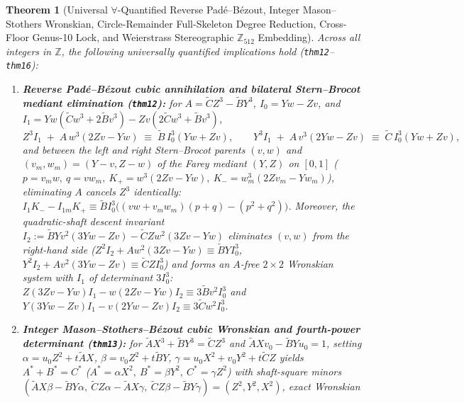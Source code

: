 \documentclass[11pt,a4paper]{article}
\theoremstyle{plain}
\newtheorem{theorem}{Theorem}[section]
\theoremstyle{definition}
\begin{document}
\begin{theorem}[Universal $\forall$-Quantified Reverse Pad\'e--B\'ezout, Integer Mason--Stothers Wronskian, Circle-Remainder Full-Skeleton Degree Reduction, Cross-Floor Genus-10 Lock, and Weierstrass Stereographic $\mathbb{Z}_{512}$ Embedding]
\label{thm:main-12-16}
Across all integers in $\mathbb{Z}$, the following universally quantified implications hold (\texttt{thm12}--\texttt{thm16}):
\begin{enumerate}[label=\textbf{(\roman*)},leftmargin=*]
\item \textbf{Reverse Pad\'e--B\'ezout cubic annihilation and bilateral Stern--Brocot mediant elimination (\texttt{thm12}):}
  for $A = \widetilde{C}Z^3 - \widetilde{B}Y^3$, $I_0 = Yw - Zv$, and $I_1 = Yw(\widetilde{C}w^3+2\widetilde{B}v^3) - Zv(2\widetilde{C}w^3+\widetilde{B}v^3)$,
  \begin{equation}
    \label{eq:reverse-pade-bezout}
    Z^3 I_1 \;+\; A\,w^3(2Zv - Yw) \;\equiv\; \widetilde{B}\,I_0^3(Yw + Zv),\qquad
    Y^3 I_1 \;+\; A\,v^3(2Yw - Zv) \;\equiv\; \widetilde{C}\,I_0^3(Yw + Zv),
  \end{equation}
  and between the left and right Stern--Brocot parents $(v,w)$ and $(v_m,w_m) = (Y-v,Z-w)$ of the Farey mediant $(Y,Z)$ on $[0,1]$ ($p = v_m w,\ q = v w_m,\ K_+ = w^3(2Zv-Yw),\ K_- = w_m^3(2Zv_m-Yw_m)$), eliminating $A$ cancels $Z^3$ identically: $I_1 K_- - I_{1m} K_+ \equiv \widetilde{B} I_0^3\bigl((vw + v_m w_m)(p+q) - (p^2+q^2)\bigr)$. Moreover, the quadratic-shaft descent invariant $I_2 := \widetilde{B}Yv^2(3Yw-Zv) - \widetilde{C}Zw^2(3Zv-Yw)$ eliminates $(v,w)$ from the right-hand side ($Z^2 I_2 + A w^2(3Zv-Yw) \equiv \widetilde{B}Y I_0^3$, $Y^2 I_2 + A v^2(3Yw-Zv) \equiv \widetilde{C}Z I_0^3$) and forms an $A$-free $2\times 2$ Wronskian system with $I_1$ of determinant $3 I_0^3$: $Z(3Zv-Yw)I_1 - w(2Zv-Yw)I_2 \equiv 3\widetilde{B}v^2 I_0^3$ and $Y(3Yw-Zv)I_1 - v(2Yw-Zv)I_2 \equiv 3\widetilde{C}w^2 I_0^3$.
\item \textbf{Integer Mason--Stothers--B\'ezout cubic Wronskian and fourth-power determinant (\texttt{thm13}):}
  for $\widetilde{A}X^3 + \widetilde{B}Y^3 = \widetilde{C}Z^3$ and $\widetilde{A}Xv_0 - \widetilde{B}Yu_0 = 1$, setting $\alpha = u_0 Z^2 + t\widetilde{A}X$, $\beta = v_0 Z^2 + t\widetilde{B}Y$, $\gamma = u_0 X^2 + v_0 Y^2 + t\widetilde{C}Z$ yields $A^*+B^*=C^*$ ($A^*=\alpha X^2,\ B^*=\beta Y^2,\ C^*=\gamma Z^2$) with shaft-square minors $(\widetilde{A}X\beta-\widetilde{B}Y\alpha,\ \widetilde{C}Z\alpha-\widetilde{A}X\gamma,\ \widetilde{C}Z\beta-\widetilde{B}Y\gamma) = (Z^2,Y^2,X^2)$, exact Wronskian

\end{enumerate}
\end{theorem}
\end{document}
